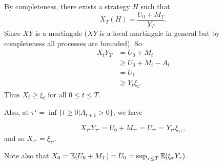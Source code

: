 By completeness, there exists a strategy $H$ such that
\begin{equation}
  \label{eq:28}
  X_{T}(H) = \frac{U_{0} + M_{T}}{Y_{T}}.
\end{equation}  Since $XY$ is a martingale ($XY$ is a local martingale
in general but by completeness all processes are bounded).  So
\begin{align}
  \label{eq:29}
  X_{t} Y_{T} &= U_{0} + M_{t} \\
  &\geq U_{0} + M_{t} - A_{t} \\
  &= U_{t} \\
  &\geq Y_{t} \xi_{t}.
\end{align} Thus $X_{t} \geq \xi_{t}$ for all $0 \leq t \leq T$.

Also, at $\tau^{\star} = \inf \{ t \geq 0 | A_{t+1} > 0 \}$, we have

\begin{equation}
  \label{eq:154}
  X_{\tau^{\star}} Y_{\tau^{\star}} = U_{0} + M_{\tau^{\star}} =
  U_{\tau^{\star}} = Y_{\tau^{\star}} \xi_{\tau^{\star}},
\end{equation} and so $X_{\tau^{\star}} = \xi_{\tau^{\star}}$.

Note also that $X_{0} = \E{U_{0} + M_{T}} = U_{0} = \sup_{\tau \leq T}
\E{\xi_{\tau} Y_{\tau}}$.
 

